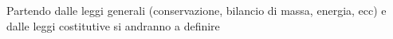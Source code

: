 Partendo dalle leggi generali (conservazione, bilancio di massa, energia, ecc) e dalle leggi costitutive si andranno a definire